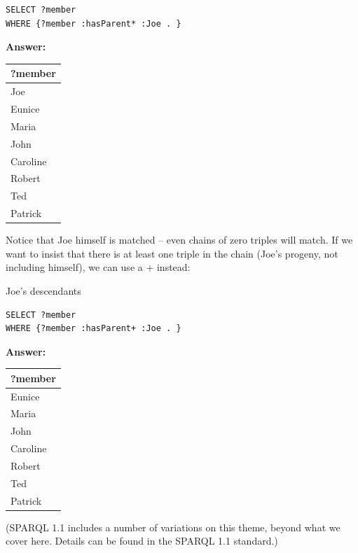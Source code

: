 \begin{lstlisting}
SELECT ?member
WHERE {?member :hasParent* :Joe . }
\end{lstlisting}

\textbf{\textbf{Answer:}}

\begin{tabular}{|l|}
\hline
?member\\
\hline
Joe\\
Eunice\\
Maria\\
John\\
Caroline\\
Robert\\
Ted\\
Patrick\\
\hline
\end{tabular}


Notice that Joe himself is matched -- even chains of zero triples will
match. If we want to insist that there is at least one triple in the
chain (Joe's progeny, not including himself), we can use a + instead:

\begin{query}Joe's descendants\end{query}

\begin{lstlisting}
SELECT ?member
WHERE {?member :hasParent+ :Joe . }
\end{lstlisting}

\textbf{\textbf{Answer:}}

\begin{tabular}{|l|}
\hline
?member\\
\hline
Eunice\\
Maria\\
John\\
Caroline\\
Robert\\
Ted\\
Patrick\\
\hline
\end{tabular}

(SPARQL 1.1 includes a number of variations on this theme, beyond what
we cover here. Details can be found in the SPARQL 1.1 standard.)

